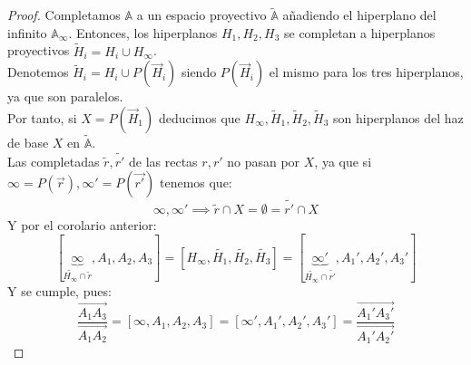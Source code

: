 \begin{proof}
    Completamos $\mathbb{A}$ a un espacio proyectivo $\widetilde{\mathbb{A}}$ añadiendo el hiperplano del infinito $\mathbb{A}_\infty$. Entonces, los hiperplanos $H_1, H_2, H_3$ se completan a hiperplanos proyectivos $\widetilde{H}_i = H_i \cup H_\infty$.\\
    Denotemos $\widetilde{H}_i=H_i \cup P(\vec{H}_i)$ siendo $P(\vec{H}_i)$ el mismo para los tres hiperplanos, ya que son paralelos.\\
    Por tanto, si $X=P(\vec{H}_1)$ deducimos que $H_\infty, \widetilde{H}_1, \widetilde{H}_2, \widetilde{H}_3$ son hiperplanos del haz de base $X$ en $\widetilde{\mathbb{A}}$.\\
    Las completadas $\widetilde{r}, \widetilde{r'}$ de las rectas $r,r'$ no pasan por $X$, ya que si $\infty = P(\vec{r}), \infty' = P(\vec{r'})$ tenemos que:
    \[
    \infty, \infty' \implies
    \widetilde{r} \cap X = \emptyset = \widetilde{r'} \cap X
    \]
    Y por el corolario anterior:
    \[
    [\underbrace{\infty}_{\widetilde{H_\infty} \cap \widetilde{r}}, A_1, A_2, A_3] =
    [H_\infty, \widetilde{H_1}, \widetilde{H_2}, \widetilde{H_3}] =
    [\underbrace{\infty'}_{\widetilde{H_\infty} \cap \widetilde{r'}}, A_1', A_2', A_3']
    \]
    Y se cumple, pues:
    \[
    \frac{\vec{A_1 A_3}}{\vec{A_1 A_2}} =
    [\infty, A_1, A_2, A_3] =
    [\infty', A_1', A_2', A_3'] =
    \frac{\vec{A_1' A_3'}}{\vec{A_1' A_2'}}
    \]
\end{proof}